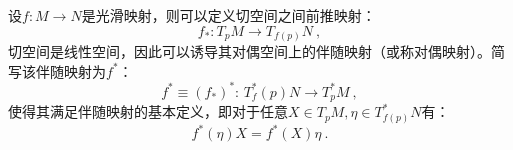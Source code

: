 
\begin{issues}
\issueDraft
\end{issues}

设$f:M\rightarrow N$是光滑映射，则可以定义切空间之间前推映射：
\begin{equation}
f_*: T_p M\rightarrow T_{f(p)}N~,
\end{equation}
切空间是线性空间，因此可以诱导其对偶空间上的伴随映射（或称对偶映射）。简写该伴随映射为$f^*$：
\begin{equation}
f^*\equiv(f_*)^*:\,T^*_f(p)N\rightarrow T_p^*M~,
\end{equation}
使得其满足伴随映射的基本定义，即对于任意$X\in T_p M,\eta\in T^*_{f(p)}N$有：
\begin{equation}
f^*(\eta)X=f^*(X)\eta~.
\end{equation}